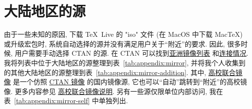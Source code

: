
\chapter{大陆地区的源}\label{chp:appendix:mirror}

由于一些未知的原因,
下载 \TeX~Live 的 "iso" 文件 (在 MacOS 中下载 Mac\TeX) 或升级宏包时,
系统自动选择的源并没有满足用户关于``附近''的要求.
因此,
很多时候,
用户需要手动选择 CTAN 的源.
在 CTAN 可以找到\href{https://ctan.org/mirrors#Asia}{亚洲镜像列表}%
和\href{https://ctan.org/mirrors/mirmon#cn}{连接情况}.
我将列表中位于大陆地区的源整理到表~\ref{tab:appendix:mirror},
并将我个人收集到的其他大陆地区的源整理到表~\ref{tab:appendix:mirror-addition}.
其中,
\href{https://mirrors.cernet.edu.cn/CTAN/systems/texlive}{高校联合镜像}%
是一个仿照
\href{https://mirrors.ctan.org/systems/texlive/}{CTAN 镜像}%
的国内镜像源,
它也可以``自动''跳转到``附近''的高校镜像.
更多内容参见%
\href{https://help.mirrors.cernet.edu.cn/}{高校联合镜像说明}.
另有一些源仅限单位内部访问,
我在表~\ref{tab:appendix:mirror-self} 中单独列出.

